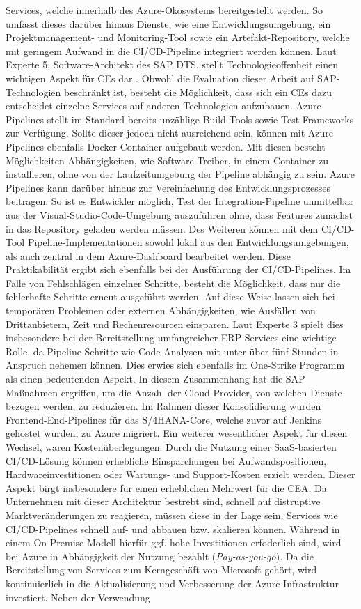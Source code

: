 Services, welche innerhalb des Azure-Ökosystems bereitgestellt werden. So umfasst dieses darüber hinaus Dienste, wie eine Entwicklungsumgebung, ein Projektmanagement- und Monitoring-Tool sowie ein Artefakt-Repository, welche mit geringem Aufwand in die CI/CD-Pipeline integriert werden können. Laut Experte 5, Software-Architekt des SAP DTS, stellt Technologieoffenheit einen wichtigen Aspekt für CEs dar \cite[Z. 8 ff.]{SoftwareArchitektSAPDTSIntegration.}. Obwohl die Evaluation dieser Arbeit auf SAP-Technologien beschränkt ist, besteht die Möglichkeit, dass sich ein CEs dazu entscheidet einzelne Services auf anderen Technologien aufzubauen. Azure Pipelines stellt im Standard bereits unzählige Build-Tools sowie Test-Frameworks zur Verfügung. Sollte dieser jedoch nicht ausreichend sein, können mit Azure Pipelines ebenfalls Docker-Container aufgebaut werden. Mit diesen besteht Möglichkeiten Abhängigkeiten, wie Software-Treiber, in einem Container zu installieren, ohne von der Laufzeitumgebung der Pipeline abhängig zu sein. Azure Pipelines kann darüber hinaus zur Vereinfachung des Entwicklungsprozesses beitragen. So ist es  Entwickler möglich, Test der Integration-Pipeline unmittelbar aus der Visual-Studio-Code-Umgebung auszuführen ohne, dass Features zunächst in das Repository geladen werden müssen. Des Weiteren können mit dem CI/CD-Tool Pipeline-Implementationen sowohl lokal aus den Entwicklungsumgebungen, als auch zentral in dem Azure-Dashboard bearbeitet werden. Diese Praktikabilität ergibt sich ebenfalls bei der Ausführung der CI/CD-Pipelines. Im Falle von Fehlschlägen einzelner Schritte, besteht die Möglichkeit, dass nur die fehlerhafte Schritte erneut ausgeführt werden. Auf diese Weise lassen sich bei temporären Problemen oder externen Abhängigkeiten, wie Ausfällen von Drittanbietern, Zeit und Rechenresourcen einsparen. Laut Experte 3 spielt dies insbesondere bei der Bereitstellung umfangreicher ERP-Services eine wichtige Rolle, da Pipeline-Schritte wie Code-Analysen mit unter über fünf Stunden in Anspruch nehemen können. Dies erwies sich ebenfalls im One-Strike Programm als einen bedeutenden Aspekt. In diesem Zusammenhang hat die SAP Maßnahmen ergriffen, um die Anzahl der Cloud-Provider, von welchen Dienste bezogen werden, zu reduzieren. Im Rahmen dieser Konsolidierung wurden Frontend-End-Pipelines für das S/4HANA-Core, welche zuvor auf Jenkins gehostet wurden, zu Azure migriert. Ein weiterer wesentlicher Aspekt für diesen Wechsel, waren Kostenüberlegungen. Durch die Nutzung einer SaaS-basierten CI/CD-Lösung können erhebliche Einsparchungen bei Aufwandspositionen, Hardwareinvestitionen oder Wartungs- und Support-Kosten erzielt werden. Dieser Aspekt birgt insbesondere für einen erheblichen Mehrwert für die CEA. Da Unternehmen mit dieser Architektur bestrebt sind, schnell auf distruptive Marktveränderungen zu reagieren, müssen diese in der Lage sein, Services wie CI/CD-Pipelines schnell auf- und abbauen bzw. skalieren können. Während in einem On-Premise-Modell hierfür ggf. hohe Investitionen erfoderlich sind, wird bei Azure in Abhängigkeit der Nutzung bezahlt (\textit{Pay-as-you-go}). Da die Bereitstellung von Services zum Kerngeschäft von Microsoft gehört, wird kontinuierlich in die Aktualisierung und Verbesserung der Azure-Infrastruktur investiert. Neben der Verwendung 